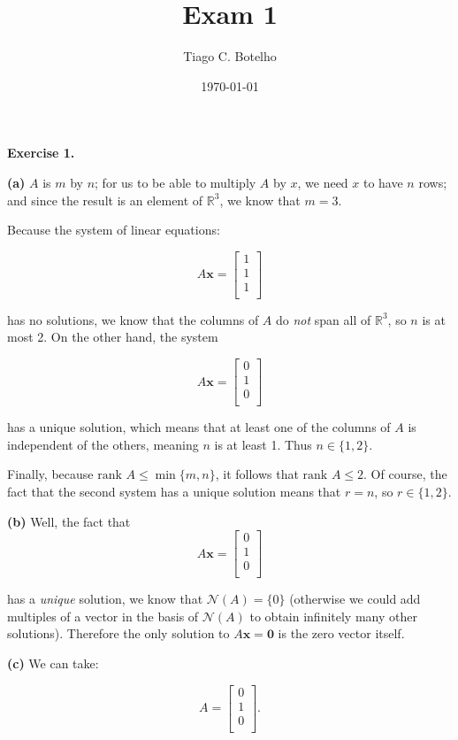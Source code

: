 \documentclass{article}
\title{Exam 1}
\author{Tiago C. Botelho}
\date{\today}
\begin{document}
\maketitle

\noindent \textbf{Exercise 1.}

\noindent \textbf{(a)} $A$ is $m$ by $n$; for us to be able to multiply $A$ by $x$, we need $x$ to have $n$ rows; and since the result is an element of $\mathbb{R}^{3}$, we know that $m = 3$.

Because the system of linear equations:

\[
A\mathbf{x} = \begin{bmatrix}
1\\
1\\
1\\
\end{bmatrix}
\]

has no solutions, we know that the columns of $A$ do \textit{not} span all of $\mathbb{R}^{3}$, so $n$ is at most 2. On the other hand, the system

\[
A\mathbf{x} = \begin{bmatrix}
0\\
1\\
0\\
\end{bmatrix}
\]

has a unique solution, which means that at least one of the columns of $A$ is independent of the others, meaning $n$ is at least 1. Thus $n \in \{1, 2\}$.

Finally, because $\text{rank }A \leq \min\{m, n\}$, it follows that $\text{rank }A \leq 2.$ Of course, the fact that the second system has a unique solution means that $r = n$, so $r \in \{1, 2\}$.

\noindent \textbf{(b)} Well, the fact that 
\[
A\mathbf{x} = \begin{bmatrix}
0\\
1\\
0\\
\end{bmatrix}
\]

has a \textit{unique} solution, we know that $\mathcal{N}(A) = \{0\}$ (otherwise we could add multiples of a vector in the basis of $\mathcal{N}(A)$ to obtain infinitely many other solutions). Therefore the only solution to $A\mathbf{x = 0}$ is the zero vector itself.

\noindent \textbf{(c)} We can take:

\[
A = \begin{bmatrix}
0\\
1\\
0\\
\end{bmatrix}.
\]
\end{document}
